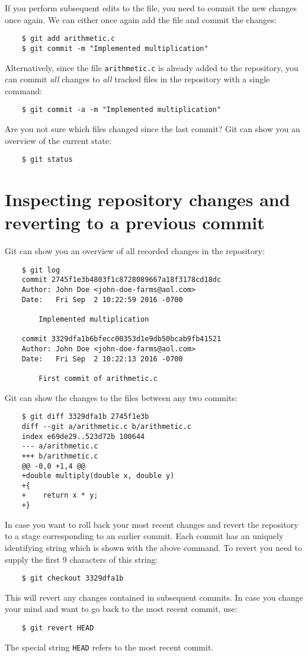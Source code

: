 \documentclass[11pt]{article}
\begin{document}
If you perform subsequent edits to the file, you need to commit the new changes 
once again.  We can either once again add the file and commit the changes:
\begin{lstlisting}
    $ git add arithmetic.c
    $ git commit -m "Implemented multiplication"
\end{lstlisting}
Alternatively, since the file \texttt{arithmetic.c} is already added to the 
repository, you can commit \emph{all} changes to \emph{all} tracked files in the 
repository with a single command:
\begin{lstlisting}
    $ git commit -a -m "Implemented multiplication"
\end{lstlisting}
Are you not sure which files changed since the last commit? Git can show you an 
overview of the current state:
\begin{lstlisting}
    $ git status
\end{lstlisting}

\section{Inspecting repository changes and reverting to a previous commit}
Git can show you an overview of all recorded changes in the repository:
\begin{lstlisting}
    $ git log
    commit 2745f1e3b4803f1c8728089667a18f3178cd18dc
    Author: John Doe <john-doe-farms@aol.com>
    Date:   Fri Sep  2 10:22:59 2016 -0700

        Implemented multiplication

    commit 3329dfa1b6bfecc00353d1e9db50bcab9fb41521
    Author: John Doe <john-doe-farms@aol.com>
    Date:   Fri Sep  2 10:22:13 2016 -0700

        First commit of arithmetic.c

\end{lstlisting}
Git can show the changes to the files between any two commits:
\begin{lstlisting}
    $ git diff 3329dfa1b 2745f1e3b
    diff --git a/arithmetic.c b/arithmetic.c
    index e69de29..523d72b 100644
    --- a/arithmetic.c
    +++ b/arithmetic.c
    @@ -0,0 +1,4 @@
    +double multiply(double x, double y)
    +{
    +    return x * y;
    +}
\end{lstlisting}

In case you want to roll back your most recent changes and revert the repository 
to a stage corresponding to an earlier commit.  Each commit has an uniquely 
identifying string which is shown with the above command.  To revert you need to 
supply the first 9 characters of this string:
\begin{lstlisting}
    $ git checkout 3329dfa1b
\end{lstlisting}
This will revert any changes contained in subsequent commits.  In case you 
change your mind and want to go back to the most recent commit, use:
\begin{lstlisting}
    $ git revert HEAD
\end{lstlisting}
The special string \texttt{HEAD} refers to the most recent commit.
\end{document}
